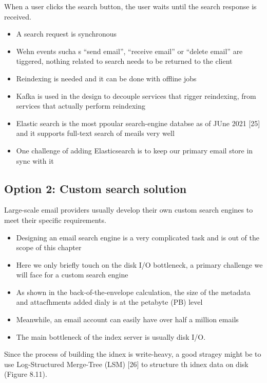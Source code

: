\documentclass{report}
\theoremstyle{definition}
\let\oldsubsection\subsection
\renewcommand{\subsection}{\oldsubsection*}
\begin{document}
When a user clicks the search button, the user waits until the search response is received.

\begin{itemize}
\item
A search request is synchronous
\item
Wehn events sucha s ``send email'', ``receive email'' or ``delete email'' are tiggered, nothing related to search needs to be returned to the client
\item
Reindexing is needed and it can be done with offline jobs
\item
Kafka is used in the design to decouple services that rigger reindexing, from services that actually perform reindexing
\item
Elastic search is the most ppoular search-engine databse as of JUne 2021 [25] and it supports full-text search of meails very well
\item
One challenge of adding Elasticsearch is to keep our primary email store in sync with it
\end{itemize}

\subsection{Option 2: Custom search solution}

Large-scale email providers usually develop their own custom search engines to meet their specific requirements.

\begin{itemize}
\item
Designing an email search engine is a very complicated task and is out of the scope of this chapter
\item
Here we only briefly touch on the disk I/O bottleneck, a primary challenge we will face for a custom search engine
\item
As shown in the back-of-the-envelope calculation, the size of the metadata and attacfhments added dialy is at the petabyte (PB) level
\item
Meanwhile, an email account can easily have over half a million emails
\item
The main bottleneck of the index server is usually disk I/O.
\end{itemize}

Since the process of building the idnex is write-heavy, a good stragey might be to use Log-Structured Merge-Tree (LSM) [26] to structure th idnex data on disk (Figure 8.11).
\end{document}
